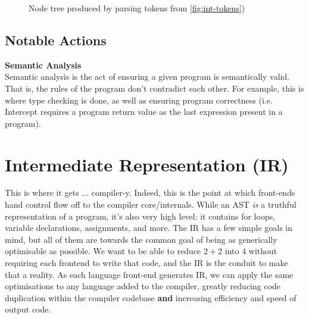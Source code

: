 \documentclass[12pt]{article}
\begin{document}
\begin{figure}[ht]
  \centering
  \caption{Node tree produced by parsing tokens from \autoref{fig:int-tokens})}
  \label{fig:int-tree}
\end{figure}

\subsection{Notable Actions}
\label{subsec:node-tree:notable-actions}

\noindent\textbf{Semantic Analysis}\\
Semantic analysis is the act of ensuring a given program is semantically valid. That is, the rules of the program don't contradict each other. For example, this is where type checking is done, as well as ensuring program correctness (i.e. Intercept requires a program return value as the last expression present in a program).

\section{Intermediate Representation (IR)}
\label{sec:ir}

This is where it gets ... compiler-y. Indeed, this is the point at which front-ends hand control flow off to the compiler core/internals. While an AST \emph{is} a truthful representation of a program, it's also very high level: it contains for loops, variable declarations, assignments, and more. The IR has a few simple goals in mind, but all of them are towards the common goal of being as generically optimisable as possible. We want to be able to reduce $2 + 2$ into $4$ without requiring each frontend to write that code, and the IR is the conduit to make that a reality. As each language front-end generates IR, we can apply the same optimisations to any language added to the compiler, greatly reducing code duplication within the compiler codebase \textbf{and} increasing efficiency and speed of output code.
\end{document}
